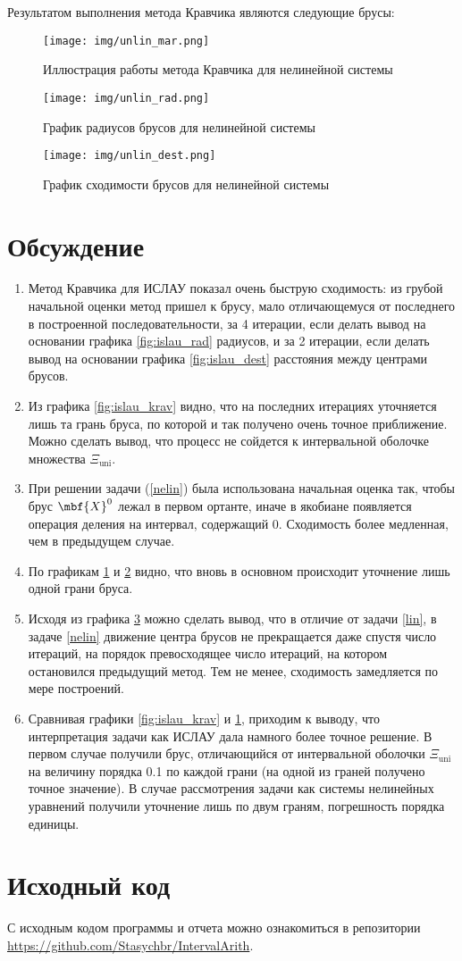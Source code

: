 \documentclass[a4paper]{article}
\begin{document}
Результатом выполнения метода Кравчика являются следующие брусы:
\begin{figure}[H]
    \centering
    \texttt{[image: img/unlin\_mar.png]}
    \caption{Иллюстрация работы метода Кравчика для нелинейной системы}
    \label{fig:nelin_krav}
\end{figure}
\begin{figure}[H]
    \centering
    \texttt{[image: img/unlin\_rad.png]}
    \caption{График радиусов брусов для нелинейной системы}
    \label{fig:nelin_rad}
\end{figure}
\begin{figure}[H]
    \centering
    \texttt{[image: img/unlin\_dest.png]}
    \caption{График сходимости брусов для нелинейной системы}
    \label{fig:nelin_dest}
\end{figure}
\section{Обсуждение}
\begin{enumerate}
    \item Метод Кравчика для ИСЛАУ показал очень быструю сходимость: из грубой начальной оценки метод пришел к брусу, мало отличающемуся от последнего в построенной последовательности, за 4 итерации, если делать вывод на основании графика \ref{fig:islau_rad} радиусов, и за 2 итерации, если делать вывод на основании графика \ref{fig:islau_dest} расстояния между центрами брусов.
    \item Из графика \ref{fig:islau_krav} видно, что на последних итерациях уточняется лишь та грань бруса, по которой и так получено очень точное приближение. Можно сделать вывод, что процесс не сойдется к интервальной оболочке множества $\Xi_{\mathrm{uni}}$.
    \item При решении задачи (\ref{nelin}) была использована начальная оценка так, чтобы брус $\mbf{X}^0$ лежал в первом ортанте, иначе в якобиане появляется операция деления на интервал, содержащий 0. Сходимость более медленная, чем в предыдущем случае.
    \item По графикам \ref{fig:nelin_krav} и \ref{fig:nelin_rad} видно, что вновь в основном происходит уточнение лишь одной грани бруса.
    \item Исходя из графика \ref{fig:nelin_dest} можно сделать вывод, что в отличие от задачи \ref{lin}, в задаче \ref{nelin} движение центра брусов не прекращается даже спустя число итераций, на порядок превосходящее число итераций, на котором остановился предыдущий метод. Тем не менее, сходимость замедляется по мере построений.
    \item Сравнивая графики \ref{fig:islau_krav} и \ref{fig:nelin_krav}, приходим к выводу, что интерпретация задачи как ИСЛАУ дала намного более точное решение. В первом случае получили брус, отличающийся от интервальной оболочки $\Xi_{\mathrm{uni}}$ на величину порядка 0.1 по каждой грани (на одной из граней получено точное значение). В случае рассмотрения задачи как системы нелинейных уравнений получили уточнение лишь по двум граням, погрешность порядка единицы.
\end{enumerate}
\section*{Исходный код}
С исходным кодом программы и отчета можно ознакомиться в репозитории \url{https://github.com/Stasychbr/IntervalArith}.
\end{document}
